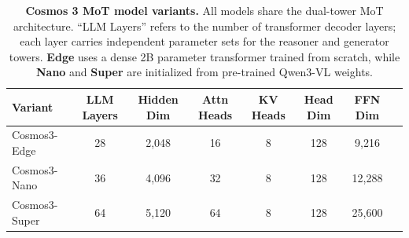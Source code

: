 \begin{table}[H]
\centering
\caption{
\textbf{Cosmos 3 MoT model variants.}
All models share the dual-tower MoT architecture. ``LLM Layers'' refers to the number of transformer decoder layers; each layer carries independent parameter sets for the reasoner and generator towers. \textbf{Edge} uses a dense 2B parameter transformer trained from scratch, while \textbf{Nano} and \textbf{Super} are initialized from pre-trained Qwen3-VL weights.}
\label{tab::model_variants}
\small
\begin{tabular}{lccccccc}
\toprule
\textbf{Variant} & \textbf{LLM Layers} & \textbf{Hidden Dim}
    & \textbf{Attn Heads} & \textbf{KV Heads} & \textbf{Head Dim}
    & \textbf{FFN Dim} \\
\midrule
Cosmos3-Edge &  28 & 2,048 & 16 & 8 & 128 & 9,216 \\
Cosmos3-Nano &  36 & 4,096 & 32 & 8 & 128 & 12,288 \\
Cosmos3-Super &  64 & 5,120 & 64 & 8 & 128 & 25,600 \\
\bottomrule
\end{tabular}
\end{table}
